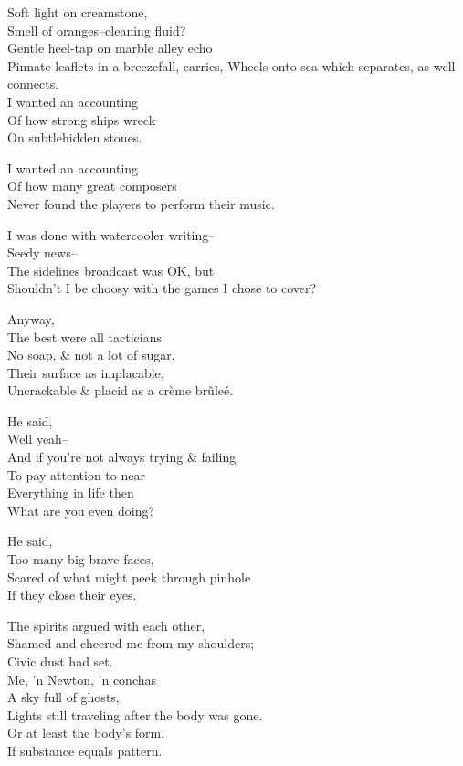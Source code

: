 Soft light on creamstone, \\
Smell of oranges--cleaning fluid? \\
Gentle heel-tap on marble alley echo \\
Pinnate leaflets in a breezefall, carries,
Wheels onto sea which separates, as well connects. \\

I wanted an accounting \\
Of how strong ships wreck \\
On subtlehidden stones. 

I wanted an accounting \\
Of how many great composers \\
Never found the players to perform their music.

I was done with watercooler writing-- \\
Seedy news-- \\
The sidelines broadcast was OK, but \\
Shouldn't I be choosy with the games I chose to cover?

Anyway, \\
The best were all tacticians \\
No soap, \& not a lot of sugar. \\
Their surface as implacable, \\
Uncrackable \& placid as a crème brûleé.

He said, \\
Well yeah-- \\
And if you're not always trying \& failing \\
To pay attention to near \\
Everything in life then \\
What are you even doing?

He said, \\
Too many big brave faces, \\
Scared of what might peek through pinhole \\
If they close their eyes.

The spirits argued with each other, \\
Shamed and cheered me from my shoulders; \\
Civic dust had set. \\
Me, 'n Newton, 'n conchas \\
A sky full of ghosts, \\
Lights still traveling after the body was gone. \\
Or at least the body's form, \\
If substance equals pattern.